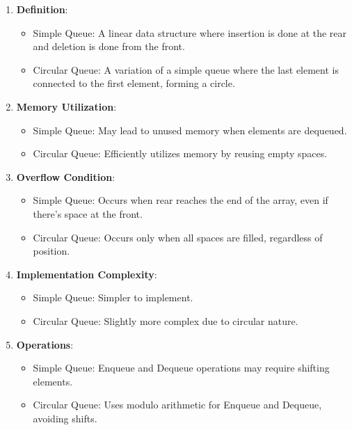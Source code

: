 \begin{enumerate}
\def\labelenumi{\arabic{enumi}.}
\tightlist
\item
  \textbf{Definition}:

  \begin{itemize}
  \tightlist
  \item
    Simple Queue: A linear data structure where insertion is done at the
    rear and deletion is done from the front.
  \item
    Circular Queue: A variation of a simple queue where the last element
    is connected to the first element, forming a circle.
  \end{itemize}
\item
  \textbf{Memory Utilization}:

  \begin{itemize}
  \tightlist
  \item
    Simple Queue: May lead to unused memory when elements are dequeued.
  \item
    Circular Queue: Efficiently utilizes memory by reusing empty spaces.
  \end{itemize}
\item
  \textbf{Overflow Condition}:

  \begin{itemize}
  \tightlist
  \item
    Simple Queue: Occurs when rear reaches the end of the array, even if
    there's space at the front.
  \item
    Circular Queue: Occurs only when all spaces are filled, regardless
    of position.
  \end{itemize}
\item
  \textbf{Implementation Complexity}:

  \begin{itemize}
  \tightlist
  \item
    Simple Queue: Simpler to implement.
  \item
    Circular Queue: Slightly more complex due to circular nature.
  \end{itemize}
\item
  \textbf{Operations}:

  \begin{itemize}
  \tightlist
  \item
    Simple Queue: Enqueue and Dequeue operations may require shifting
    elements.
  \item
    Circular Queue: Uses modulo arithmetic for Enqueue and Dequeue,
    avoiding shifts.
  \end{itemize}
\end{enumerate}

